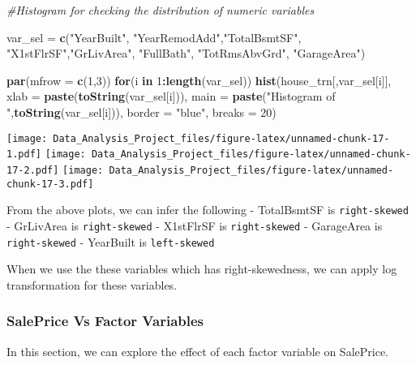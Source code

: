 \documentclass[]{article}
\newenvironment{Shaded}{\begin{snugshade}}{\end{snugshade}}
\newcommand{\KeywordTok}[1]{\textcolor[rgb]{0.13,0.29,0.53}{\textbf{#1}}}
\newcommand{\DataTypeTok}[1]{\textcolor[rgb]{0.13,0.29,0.53}{#1}}
\newcommand{\DecValTok}[1]{\textcolor[rgb]{0.00,0.00,0.81}{#1}}
\newcommand{\StringTok}[1]{\textcolor[rgb]{0.31,0.60,0.02}{#1}}
\newcommand{\CommentTok}[1]{\textcolor[rgb]{0.56,0.35,0.01}{\textit{#1}}}
\newcommand{\ControlFlowTok}[1]{\textcolor[rgb]{0.13,0.29,0.53}{\textbf{#1}}}
\newcommand{\OperatorTok}[1]{\textcolor[rgb]{0.81,0.36,0.00}{\textbf{#1}}}
\newcommand{\NormalTok}[1]{#1}
\begin{document}
\begin{Shaded}
\begin{Highlighting}[]
\CommentTok{#Histogram for checking the distribution of numeric variables}

\NormalTok{var_sel =}\StringTok{ }\KeywordTok{c}\NormalTok{(}\StringTok{"YearBuilt"}\NormalTok{, }\StringTok{"YearRemodAdd"}\NormalTok{,}\StringTok{"TotalBsmtSF"}\NormalTok{, }\StringTok{"X1stFlrSF"}\NormalTok{,}\StringTok{"GrLivArea"}\NormalTok{, }\StringTok{"FullBath"}\NormalTok{, }\StringTok{"TotRmsAbvGrd"}\NormalTok{, }\StringTok{"GarageArea"}\NormalTok{)}

\KeywordTok{par}\NormalTok{(}\DataTypeTok{mfrow =} \KeywordTok{c}\NormalTok{(}\DecValTok{1}\NormalTok{,}\DecValTok{3}\NormalTok{))}
\ControlFlowTok{for}\NormalTok{(i }\ControlFlowTok{in} \DecValTok{1}\OperatorTok{:}\KeywordTok{length}\NormalTok{(var_sel))}
\KeywordTok{hist}\NormalTok{(house_trn[,var_sel[i]],}
    \DataTypeTok{xlab   =} \KeywordTok{paste}\NormalTok{(}\KeywordTok{toString}\NormalTok{(var_sel[i])),}
    \DataTypeTok{main   =} \KeywordTok{paste}\NormalTok{(}\StringTok{"Histogram of "}\NormalTok{,}\KeywordTok{toString}\NormalTok{(var_sel[i])),}
    \DataTypeTok{border =} \StringTok{"blue"}\NormalTok{,}
    \DataTypeTok{breaks =} \DecValTok{20}\NormalTok{)}
\end{Highlighting}
\end{Shaded}

\texttt{[image: Data\_Analysis\_Project\_files/figure-latex/unnamed-chunk-17-1.pdf]}
\texttt{[image: Data\_Analysis\_Project\_files/figure-latex/unnamed-chunk-17-2.pdf]}
\texttt{[image: Data\_Analysis\_Project\_files/figure-latex/unnamed-chunk-17-3.pdf]}

From the above plots, we can infer the following - TotalBsmtSF is
\texttt{right-skewed} - GrLivArea is \texttt{right-skewed} - X1stFlrSF
is \texttt{right-skewed} - GarageArea is \texttt{right-skewed} -
YearBuilt is \texttt{left-skewed}

When we use the these variables which has right-skewedness, we can apply
log transformation for these variables.

\subsubsection{SalePrice Vs Factor
Variables}\label{saleprice-vs-factor-variables}

In this section, we can explore the effect of each factor variable on
SalePrice.
\end{document}
